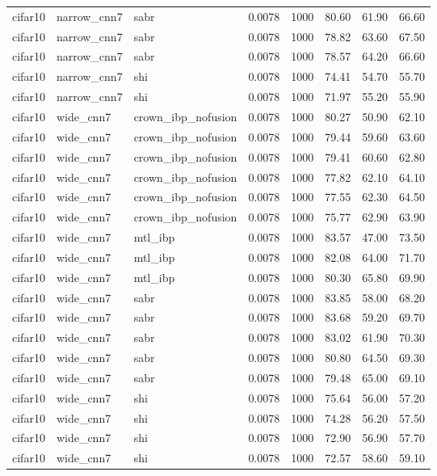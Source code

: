 \begin{tabular}{llllllll}
cifar10 & narrow_cnn7 & sabr & 0.0078 & 1000 & 80.60 & 61.90 & 66.60 \\
cifar10 & narrow_cnn7 & sabr & 0.0078 & 1000 & 78.82 & 63.60 & 67.50 \\
cifar10 & narrow_cnn7 & sabr & 0.0078 & 1000 & 78.57 & 64.20 & 66.60 \\
cifar10 & narrow_cnn7 & shi & 0.0078 & 1000 & 74.41 & 54.70 & 55.70 \\
cifar10 & narrow_cnn7 & shi & 0.0078 & 1000 & 71.97 & 55.20 & 55.90 \\
cifar10 & wide_cnn7 & crown\_ibp\_nofusion & 0.0078 & 1000 & 80.27 & 50.90 & 62.10 \\
cifar10 & wide_cnn7 & crown\_ibp\_nofusion & 0.0078 & 1000 & 79.44 & 59.60 & 63.60 \\
cifar10 & wide_cnn7 & crown\_ibp\_nofusion & 0.0078 & 1000 & 79.41 & 60.60 & 62.80 \\
cifar10 & wide_cnn7 & crown\_ibp\_nofusion & 0.0078 & 1000 & 77.82 & 62.10 & 64.10 \\
cifar10 & wide_cnn7 & crown\_ibp\_nofusion & 0.0078 & 1000 & 77.55 & 62.30 & 64.50 \\
cifar10 & wide_cnn7 & crown\_ibp\_nofusion & 0.0078 & 1000 & 75.77 & 62.90 & 63.90 \\
cifar10 & wide_cnn7 & mtl\_ibp & 0.0078 & 1000 & 83.57 & 47.00 & 73.50 \\
cifar10 & wide_cnn7 & mtl\_ibp & 0.0078 & 1000 & 82.08 & 64.00 & 71.70 \\
cifar10 & wide_cnn7 & mtl\_ibp & 0.0078 & 1000 & 80.30 & 65.80 & 69.90 \\
cifar10 & wide_cnn7 & sabr & 0.0078 & 1000 & 83.85 & 58.00 & 68.20 \\
cifar10 & wide_cnn7 & sabr & 0.0078 & 1000 & 83.68 & 59.20 & 69.70 \\
cifar10 & wide_cnn7 & sabr & 0.0078 & 1000 & 83.02 & 61.90 & 70.30 \\
cifar10 & wide_cnn7 & sabr & 0.0078 & 1000 & 80.80 & 64.50 & 69.30 \\
cifar10 & wide_cnn7 & sabr & 0.0078 & 1000 & 79.48 & 65.00 & 69.10 \\
cifar10 & wide_cnn7 & shi & 0.0078 & 1000 & 75.64 & 56.00 & 57.20 \\
cifar10 & wide_cnn7 & shi & 0.0078 & 1000 & 74.28 & 56.20 & 57.50 \\
cifar10 & wide_cnn7 & shi & 0.0078 & 1000 & 72.90 & 56.90 & 57.70 \\
cifar10 & wide_cnn7 & shi & 0.0078 & 1000 & 72.57 & 58.60 & 59.10 \\

\end{tabular}

